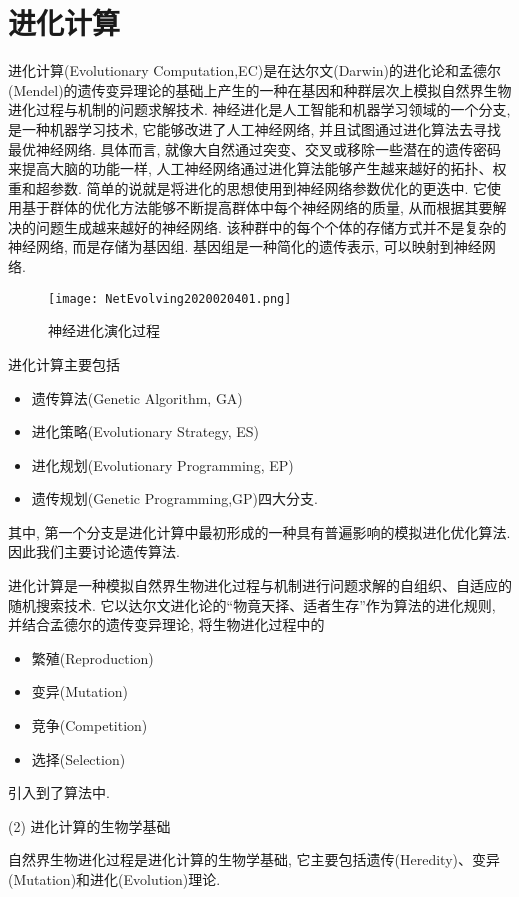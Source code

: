 \section{进化计算}
进化计算(Evolutionary Computation,EC)是在达尔文(Darwin)的进化论和孟德尔(Mendel)的遗传变异理论的基础上产生的一种在基因和种群层次上模拟自然界生物进化过程与机制的问题求解技术.
神经进化是人工智能和机器学习领域的一个分支, 是一种机器学习技术, 它能够改进了人工神经网络, 并且试图通过进化算法去寻找最优神经网络. 具体而言, 就像大自然通过突变、交叉或移除一些潜在的遗传密码来提高大脑的功能一样, 人工神经网络通过进化算法能够产生越来越好的拓扑、权重和超参数. 简单的说就是将进化的思想使用到神经网络参数优化的更迭中. 它使用基于群体的优化方法能够不断提高群体中每个神经网络的质量, 从而根据其要解决的问题生成越来越好的神经网络. 该种群中的每个个体的存储方式并不是复杂的神经网络, 而是存储为基因组. 基因组是一种简化的遗传表示, 可以映射到神经网络.
\begin{figure}[H]
\centering
\texttt{[image: NetEvolving2020020401.png]}
\caption{神经进化演化过程}
\label{NetEvolving2020020401}
\end{figure}

进化计算主要包括
\begin{itemize}
\item 遗传算法(Genetic Algorithm, GA)
\item 进化策略(Evolutionary Strategy, ES)
\item 进化规划(Evolutionary Programming, EP)
\item 遗传规划(Genetic Programming,GP)四大分支.
\end{itemize}
其中, 第一个分支是进化计算中最初形成的一种具有普遍影响的模拟进化优化算法. 因此我们主要讨论遗传算法.

进化计算是一种模拟自然界生物进化过程与机制进行问题求解的自组织、自适应的随机搜索技术. 它以达尔文进化论的“物竟天择、适者生存”作为算法的进化规则, 并结合孟德尔的遗传变异理论, 将生物进化过程中的
\begin{itemize}
\item 繁殖(Reproduction)
\item 变异(Mutation)
\item 竞争(Competition)
\item 选择(Selection)
\end{itemize}
引入到了算法中.

  (2) 进化计算的生物学基础

  自然界生物进化过程是进化计算的生物学基础, 它主要包括遗传(Heredity)、变异(Mutation)和进化(Evolution)理论.

